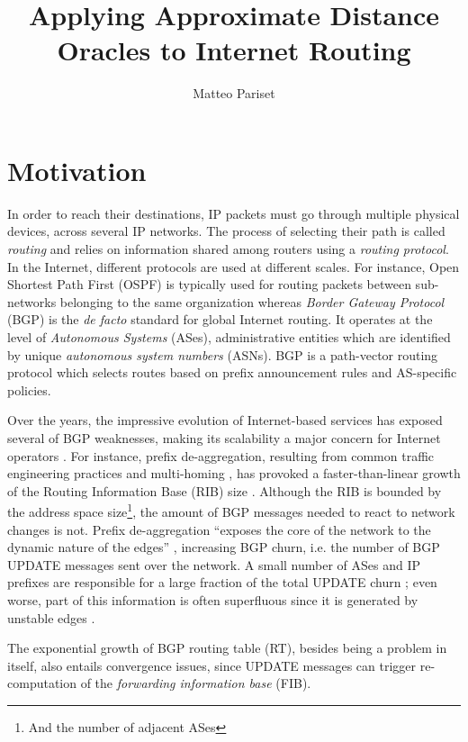 \documentclass[a4paper,11pt,oneside]{report}
\title{Applying Approximate Distance Oracles to Internet Routing}
\author{Matteo Pariset}
\begin{document}
\maketitle


\chapter{Motivation}
In order to reach their destinations, IP packets must go through multiple physical devices, across several IP networks. The process of selecting their path is called \emph{routing} and relies on information shared among routers using a \emph{routing protocol}. In the Internet, different protocols are used at different scales. For instance, Open Shortest Path First (OSPF) is typically used for routing packets between sub-networks belonging to the same organization whereas \emph{Border Gateway Protocol} (BGP) is the \textit{de facto} standard for global Internet routing. It operates at the level of \emph{Autonomous Systems} (ASes), administrative entities which are identified by unique \emph{autonomous system numbers} (ASNs).
BGP is a path-vector routing protocol which selects routes based on prefix announcement rules and AS-specific policies.

\bigskip
Over the years, the impressive evolution of Internet-based services has exposed several of BGP weaknesses, making its scalability a major concern for Internet operators \cite{elmokashfiScalabilityBGPRole2010}. For instance, prefix de-aggregation, resulting from common traffic engineering practices and multi-homing \cite{dReportIABWorkshop}, has provoked a faster-than-linear growth of the Routing Information Base (RIB) size \cite{Potaroo}. Although the RIB is bounded by the address space size\footnote{And the number of adjacent ASes}, the amount of BGP messages needed to react to network changes is not. Prefix de-aggregation ``exposes the core of the network to the dynamic nature of the edges'' \cite{dReportIABWorkshop}, increasing BGP churn, i.e. the number of BGP UPDATE messages sent over the network. A small number of ASes and IP prefixes are responsible for a large fraction of the total UPDATE churn \cite{BGPchurnCore2012}; even worse, part of this information is often superfluous since it is generated by unstable edges \cite{Oliveira_measurementof}.

The exponential growth of BGP routing table (RT), besides being a problem in itself, also entails convergence issues, since UPDATE messages can trigger re-computation of the \emph{forwarding information base} (FIB).
\end{document}
